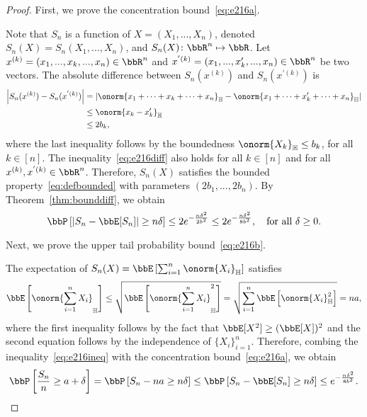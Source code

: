 \documentclass[11pt]{article}
\newcommand{\off}[1]{\left[#1\right]}
\newcommand{\aabs}[1]{\left|#1\right|}
\theoremstyle{plain}
\theoremstyle{definition}
\begin{document}
    \begin{proof} First, we prove the concentration bound~\eqref{eq:e216a}.
    
    \vspace{0.2cm}
    	Note that $S_n$ is a function of $X=(X_1,...,X_n)$, denoted $S_n(X) = S_n(X_1,...,X_n)$, and $S_n(X) \colon \bbR^n \mapsto \bbR$.  Let $x^{(k)} = (x_1,...,x_k,...,x_n) \in \bbR^n$ and $x^{'(k)} = (x_1,...,x'_k,...,x_n)\in \bbR^n$ be two vectors. The absolute difference between $S_n(x^{(k)})$ and $S_n(x^{'(k)})$ is
    	\begin{align}
    		\aabs{S_n(x^{(k)}) - S_n(x^{'(k)})} &= \aabs{\onorm{x_1 + \cdots +x_k + \cdots + x_n}_{\mathbb{H}} - \onorm{x_1 + \cdots +x'_k + \cdots + x_n}_{\mathbb{H}} }\\
    		& \leq \onorm{x_k - x'_k}_{\mathbb{H}}\\
    		& \leq 2b_k, \label{eq:e216diff}
    	\end{align}
    	where the last inequality follows by the boundedness $\onorm{X_k}_{\mathbb{H}} \leq b_k$, for all $k \in [n]$. The inequality~\eqref{eq:e216diff} also holds for all $k \in [n]$ and for all $x^{(k)},x^{'(k)} \in \bbR^n$. Therefore, $S_n(X)$ satisfies the bounded property~\eqref{eq:defbounded} with parameters $(2b_1,...,2b_n)$. By Theorem~\ref{thm:bounddiff}, we obtain
    	\begin{equation}
    		\bbP\off{|S_n - \bbE[S_n]| \geq n\delta} \leq 2 e^{- \frac{n \delta^2}{2b^2}} \leq 2 e^{- \frac{n \delta^2}{8b^2}}, \quad \text{for all }\delta \geq 0.
    	\end{equation}
    	
    	\vspace{0.2cm}
    	Next, we prove the upper tail probability bound~\eqref{eq:e216b}.
    	
    	\vspace{0.2cm}
    	The expectation of $S_n(X) = \bbE \off{ \sum_{i=1}^n  \onorm{X_i}_{\mathbb{H}}}$ satisfies
    	\begin{equation}\label{eq:e216ineq}
    		 \bbE \off{ \onorm{ \sum_{i=1}^n  X_i}_{\mathbb{H}} } \leq \sqrt{ \bbE \off{ \onorm{\sum_{i=1}^n X_i }_{\mathbb{H}}^2  }} = \sqrt{ \sum_{i=1}^n \bbE \off{ \onorm{X_i}^2_{\mathbb{H}} } } = na,
    	\end{equation}
    	where the first inequality follows by the fact that $\bbE[X^2] \geq (\bbE[X] )^2$ and the second equation follows by the independence of $\{X_i\}_{i=1}^n$. Therefore, combing the inequality~\eqref{eq:e216ineq} with the concentration bound~\eqref{eq:e216a}, we obtain
    	\begin{equation}
    		\bbP \off{\frac{S_n}{n} \geq a + \delta} = \bbP \off{S_n - na \geq n\delta} \leq \bbP \off{S_n - \bbE[S_n] \geq n\delta } \leq e^{-\frac{n\delta^2}{8 b^2}}.
    	\end{equation}
    \end{proof}
    
\end{document}

